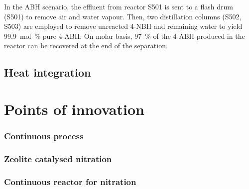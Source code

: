 In the ABH scenario, the effluent from reactor S501 is sent to a flash drum (S501) to remove air and water vapour. Then, two distillation columns (S502, S503) are employed to remove unreacted 4-NBH and remaining water to yield  \SI{99.9}{mol\percent} pure 4-ABH. On molar basis, \SI{97}{\percent} of the 4-ABH produced in the reactor can be recovered at the end of the separation.




\subsection{Heat integration}%


\section{Points of innovation}

\subsubsection{Continuous process}


\subsubsection{Zeolite catalysed nitration}

\subsubsection{Continuous reactor for nitration}

